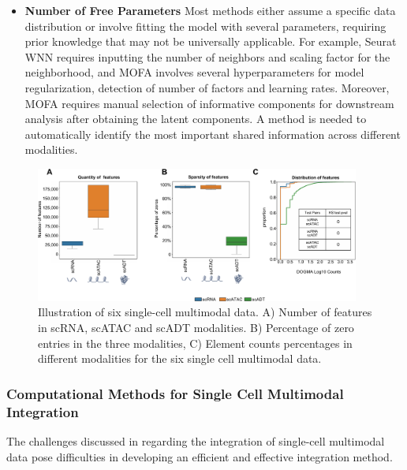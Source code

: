 \begin{itemize}
    \item \textbf{Number of Free Parameters}
    Most methods either assume a specific data distribution or involve fitting the model with several parameters, requiring prior knowledge that may not be universally applicable. For example, Seurat WNN requires inputting the number of neighbors and scaling factor for the neighborhood, and MOFA involves several hyperparameters for model regularization, detection of number of factors and learning rates. Moreover, MOFA requires manual selection of informative components for downstream analysis after obtaining the latent components. A method is needed to automatically identify the most important shared information across different modalities.

\end{itemize}

\begin{figure}[!ht]
	\centering
	\includegraphics[width=0.95\textwidth]{feature_statistic/fig}
	\vspace{0.1cm}
	\caption[features characteristics comparison showing the challenge of multimodal integration.]{Illustration of six single-cell multimodal data. A) Number of features in scRNA, scATAC and scADT modalities. B) Percentage of zero entries in the three modalities, C) Element counts percentages in different modalities for the six single cell multimodal data.}
	\label{fig:modalities_differences}
\end{figure}

\subsubsection{Computational Methods for Single Cell Multimodal Integration}
\label{bgInte:integration}
The challenges discussed in  regarding the integration of single-cell multimodal data pose difficulties in developing an efficient and effective integration method.

